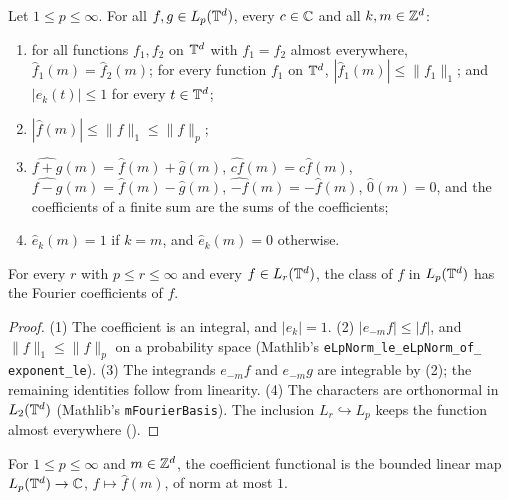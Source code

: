 \begin{lemma}
\label{lem:torus-lp-coefficients}
\leanok
{}
Let $1 \leq p \leq \infty$. For all $f, g \in L_p(\mathbb{T}^d)$, every $c \in \mathbb{C}$ and all
$k, m \in \mathbb{Z}^d$:
\begin{enumerate}
  \item for all functions $f_1, f_2$ on $\mathbb{T}^d$ with $f_1 = f_2$ almost everywhere,
    $\hat f_1(m) = \hat f_2(m)$; for every function $f_1$ on $\mathbb{T}^d$,
    $|\hat f_1(m)| \leq \|f_1\|_1$; and $|e_k(t)| \leq 1$ for every $t \in \mathbb{T}^d$;
  \item $|\hat f(m)| \leq \|f\|_1 \leq \|f\|_p$;
  \item $\widehat{f + g}(m) = \hat f(m) + \hat g(m)$, $\widehat{c f}(m) = c \hat f(m)$,
    $\widehat{f - g}(m) = \hat f(m) - \hat g(m)$, $\widehat{-f}(m) = -\hat f(m)$,
    $\hat 0(m) = 0$, and the coefficients of a finite sum are the sums of the coefficients;
  \item $\hat e_k(m) = 1$ if $k = m$, and $\hat e_k(m) = 0$ otherwise.
\end{enumerate}
For every $r$ with $p \leq r \leq \infty$ and every $f \in L_r(\mathbb{T}^d)$, the class of $f$ in
$L_p(\mathbb{T}^d)$ has the Fourier coefficients of $f$.
\end{lemma}

\begin{proof}
\leanok
(1) The coefficient is an integral, and $|e_k| = 1$. (2) $|e_{-m} f| \leq |f|$, and
$\|f\|_1 \leq \|f\|_p$ on a probability space (Mathlib's
\texttt{eLpNorm\_\allowbreak le\_\allowbreak eLpNorm\_\allowbreak of\_\allowbreak
exponent\_\allowbreak le}).
(3) The integrands $e_{-m} f$ and $e_{-m} g$ are integrable by (2); the remaining identities
follow from linearity. (4) The characters are
orthonormal in $L_2(\mathbb{T}^d)$ (Mathlib's \texttt{mFourierBasis}). The inclusion
$L_r \hookrightarrow L_p$ keeps the function almost everywhere ().
\end{proof}

\begin{definition}
\label{def:torus-coefficient-functional}
\leanok
{}
For $1 \leq p \leq \infty$ and $m \in \mathbb{Z}^d$, the coefficient functional is the bounded linear
map $L_p(\mathbb{T}^d) \to \mathbb{C}$, $f \mapsto \hat f(m)$, of norm at most $1$.
\end{definition}


